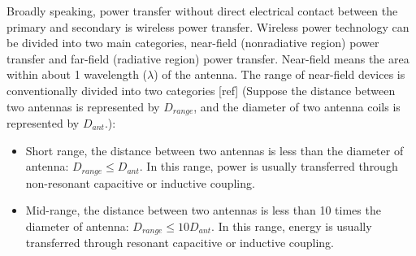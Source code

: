 Broadly speaking, power transfer without direct electrical contact between the primary and secondary is wireless power transfer. Wireless power technology can be divided into two main categories, near-field (nonradiative region) power transfer and far-field (radiative region) power transfer. 
Near-field means the area within about 1 wavelength ($\lambda$) of the antenna. The range of near-field devices is conventionally divided into two categories [ref] (Suppose the distance between two antennas is represented by $D_{range}$, and the diameter of two antenna coils is represented by $D_{ant}$.):
\begin{itemize}
    \item  Short range, the distance between two antennas is less than the diameter of antenna: $D_{range} \leq D_{ant}$. In this range, power is usually transferred through non-resonant capacitive or inductive coupling.
    \item Mid-range, the distance between two antennas is less than 10 times the diameter of antenna:  $D_{range} \leq 10 D_{ant}$. In this range, energy is usually transferred through resonant capacitive or inductive coupling.
\end{itemize} 

